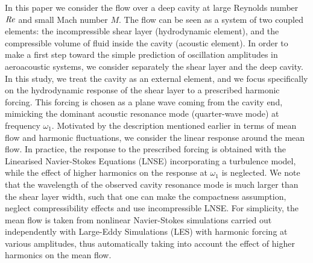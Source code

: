 \documentclass[11pt,onecolumn]{article}
\newcommand\Rey{\mbox{\textit{Re}}}
\begin{document}
In this paper we consider the flow over a deep cavity at large Reynolds number $\Rey$ and small Mach number $M$.
%
The flow can be seen as a system of two coupled elements: 
the incompressible shear layer (hydrodynamic element), and the compressible volume of fluid inside the cavity (acoustic element). 
%
In order to make a first step toward the simple prediction of oscillation amplitudes in aeroacoustic systems, we consider separately the shear layer and the deep cavity. 
In this study, we treat the cavity as an external element, and we focus specifically on the hydrodynamic response of the shear layer to a prescribed harmonic forcing.
This forcing is chosen as a plane wave coming from the cavity end, mimicking the dominant acoustic resonance mode (quarter-wave mode) at frequency $\omega_1$.
%
Motivated by the 
description mentioned earlier in terms of mean flow and harmonic fluctuations, we consider the linear response around the mean flow. 
In practice, the response to the prescribed forcing is obtained with the Linearised Navier-Stokes Equations (LNSE) incorporating a turbulence model, while the effect of higher harmonics on the response at $\omega_1$ is neglected.
We note that the wavelength of the observed cavity resonance mode is much larger than the shear layer width, such that one can make the  compactness assumption, neglect compressibility effects and use incompressible LNSE.
For simplicity, the mean flow is taken from nonlinear Navier-Stokes simulations carried out independently with Large-Eddy Simulations (LES) with harmonic forcing at various amplitudes, thus automatically taking into account the effect of higher harmonics on the mean flow.
\end{document}

